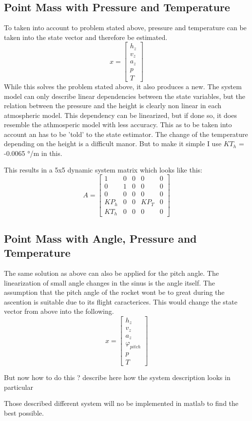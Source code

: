   \subsection{Point Mass with Pressure and Temperature}
  To taken into account to problem stated above, pressure and temperature can be taken into the state vector and therefore be estimated.
    $$ x = \begin{bmatrix}
  h_z\\
  v_z\\
  a_z\\
  p\\
  T
  \end{bmatrix} $$ 
  While this solves the problem stated above, it also produces a new. The system model can only describe linear dependencies between the state variables,
  but the relation between the pressure and the height is clearly non linear in each atmospheric model.
  This dependency can be linearized, but if done so, it does resemble the athmosperic model with less accuracy.
  This as to be taken into account an has to be 'told' to the state estimator.
  The change of the temperature depending on the height is a difficult manor.
  But to make it simple I use $KT_h$ =  -0.0065 °/m in this.
  
  This results in a 5x5 dynamic system matrix which looks like this:
  $$ A = \begin{bmatrix}
         1    & 0 & 0 & 0    & 0 \\
         0    & 1 & 0 & 0    & 0 \\
         0    & 0 & 0 & 0    & 0 \\
         KP_h & 0 & 0 & KP_T & 0 \\
         KT_h & 0 & 0 & 0    & 0 
        \end{bmatrix} $$
        
  
  \subsection{Point Mass with Angle, Pressure and Temperature}
  The same solution as above can also be applied for the pitch angle. The linearization of small angle changes in the sinus is the angle itself.
  The assumption that the pitch angle of the rocket wont be to great during the ascention is suitable due to its flight caracterices.
  This would change the state vector from above into the following.
  $$ x = \begin{bmatrix}
  h_z\\
  v_z\\
  a_z\\
  \varphi_{pitch}\\
  p\\
  T
  \end{bmatrix} $$
  
  But now how to do this ?
  describe here how the system description looks in particular 
  
  
  Those described different system will no be implemented in matlab to find the best possible.

